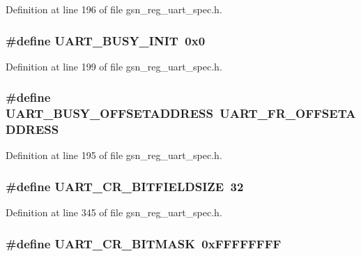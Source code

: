 Definition at line 196 of file gsn\_\-reg\_\-uart\_\-spec.h.

\hypertarget{a00575_adee72654e24d4a24a72880814744f052}{
\subsubsection[{UART\_\-BUSY\_\-INIT}]{\setlength{\rightskip}{0pt plus 5cm}\#define UART\_\-BUSY\_\-INIT~0x0}}
\label{a00575_adee72654e24d4a24a72880814744f052}


Definition at line 199 of file gsn\_\-reg\_\-uart\_\-spec.h.

\hypertarget{a00575_adab381e51e943b8e0bccef69a189b426}{
\subsubsection[{UART\_\-BUSY\_\-OFFSETADDRESS}]{\setlength{\rightskip}{0pt plus 5cm}\#define UART\_\-BUSY\_\-OFFSETADDRESS~UART\_\-FR\_\-OFFSETADDRESS}}
\label{a00575_adab381e51e943b8e0bccef69a189b426}


Definition at line 195 of file gsn\_\-reg\_\-uart\_\-spec.h.

\hypertarget{a00575_aa945e1931f08a5bf024c3070a546b650}{
\subsubsection[{UART\_\-CR\_\-BITFIELDSIZE}]{\setlength{\rightskip}{0pt plus 5cm}\#define UART\_\-CR\_\-BITFIELDSIZE~32}}
\label{a00575_aa945e1931f08a5bf024c3070a546b650}


Definition at line 345 of file gsn\_\-reg\_\-uart\_\-spec.h.

\hypertarget{a00575_a2951c6c04fbdb7a1a78e4758bd08f4cc}{
\subsubsection[{UART\_\-CR\_\-BITMASK}]{\setlength{\rightskip}{0pt plus 5cm}\#define UART\_\-CR\_\-BITMASK~0xFFFFFFFF}}
\label{a00575_a2951c6c04fbdb7a1a78e4758bd08f4cc}


